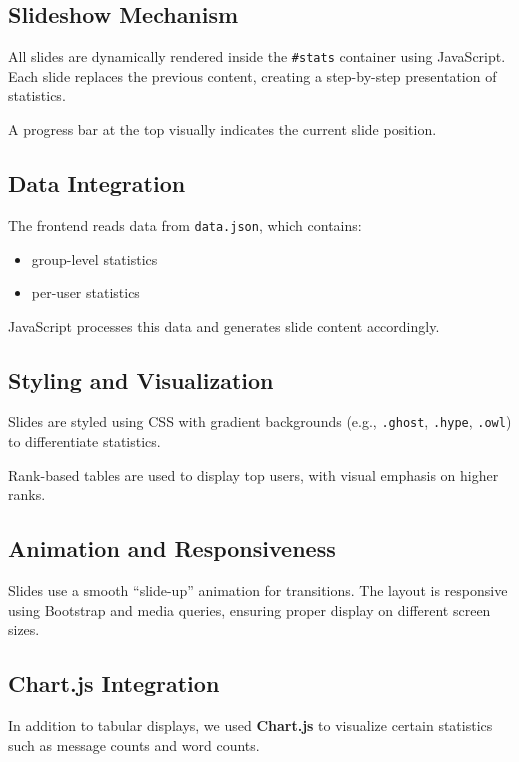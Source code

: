 \documentclass[12pt]{article}
\begin{document}
\subsection{Slideshow Mechanism}

All slides are dynamically rendered inside the \texttt{#stats} container using JavaScript. Each slide replaces the previous content, creating a step-by-step presentation of statistics.

A progress bar at the top visually indicates the current slide position.

\subsection{Data Integration}

The frontend reads data from \texttt{data.json}, which contains:
\begin{itemize}
\item group-level statistics
\item per-user statistics
\end{itemize}

JavaScript processes this data and generates slide content accordingly.

\subsection{Styling and Visualization}

Slides are styled using CSS with gradient backgrounds (e.g., \texttt{.ghost}, \texttt{.hype}, \texttt{.owl}) to differentiate statistics. 

Rank-based tables are used to display top users, with visual emphasis on higher ranks.

\subsection{Animation and Responsiveness}

Slides use a smooth ``slide-up'' animation for transitions. The layout is responsive using Bootstrap and media queries, ensuring proper display on different screen sizes.

\subsection{Chart.js Integration}

In addition to tabular displays, we used \textbf{Chart.js} to visualize certain statistics such as message counts and word counts.
\end{document}
